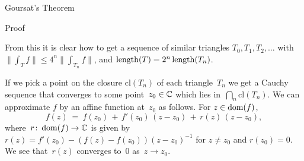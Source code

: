 \documentclass[a]{subfiles}
\begin{document}
\begin{parsec}
\begin{point}[goursat]{Goursat's Theorem}
\begin{point}[goursat-1]{Proof}
\begin{point}[goursat-2]
From this it is clear how to
 get a sequence of similar triangles $T_0, T_1, T_2, \dotsc$
with $\|\int_Tf\|\leq 4^n \|\int_{T_n} f\|$,
and $\operatorname{length}(T)=2^n\operatorname{length}(T_n)$.
\end{point}
\begin{point}%
If we pick a point on the closure $\mathrm{cl}(T_n)$
of each triangle~$T_n$ 
we get a Cauchy sequence
that converges to some point~$z_0\in\mathbb{C}$
which lies in~$\bigcap_n \mathrm{cl}(T_n)$.
We can approximate $f$ by an affine
function at~$z_0$ as follows.
For $z\in \operatorname{dom}(f)$,
\begin{equation*}
f(z)\ = \ f(z_0)\,+\,f'(z_0)\,(z-z_0)\,+\,r(z)\,(z-z_0),
\end{equation*}
where~$r\colon \operatorname{dom}(f)\to \mathbb{C}$
is given by $r(z)=f'(z_0)-(f(z)-f(z_0))(z-z_0)^{-1}$ for $z\neq z_0$
and $r(z_0)=0$.
We see that~$r(z)$ converges to~$0$ as~$z\to z_0$.


\end{point}
\end{point}
\end{point}
\end{parsec}
\end{document}
